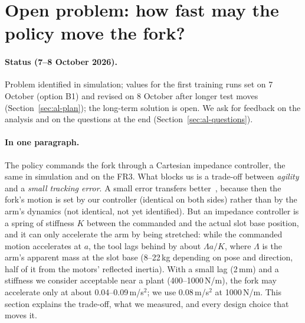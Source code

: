 
\section{Open problem: how fast may the policy move the fork?}
\label{sec:al}

\paragraph{Status (7--8 October 2026).} Problem identified in simulation; values for the first training runs set
on 7 October (option B1) and revised on 8 October after longer test moves (Section~\ref{sec:al-plan}); the
long-term solution is open. We ask for feedback on the analysis and on the
questions at the end (Section~\ref{sec:al-questions}).

\paragraph{In one paragraph.} The policy commands the fork through a Cartesian impedance controller, the same in
simulation and on the FR3. What blocks us is a trade-off between \emph{agility} and a \emph{small tracking error}.
A small error transfers better~\cite{al-aljalbout2024}, because then the fork's motion is set by our controller
(identical on both sides) rather than by the arm's dynamics (not identical, not yet identified). But an impedance
controller is a spring of stiffness $K$ between the commanded and the actual slot base position, and it can only
accelerate the arm by being stretched: while the commanded motion accelerates at $a$, the tool lags behind by about
$\Lambda a/K$, where $\Lambda$ is the arm's apparent mass at the slot base (8--22\,kg depending on pose and direction,
half of it from the motors' reflected inertia). With a small lag (2\,mm) and a stiffness we consider acceptable near a
plant (400--1000\,N/m), the fork may accelerate only at about 0.04--0.09\,m/s$^2$; we use 0.08\,m/s$^2$ at
1000\,N/m. This section explains the
trade-off, what we measured, and every design choice that moves it.

